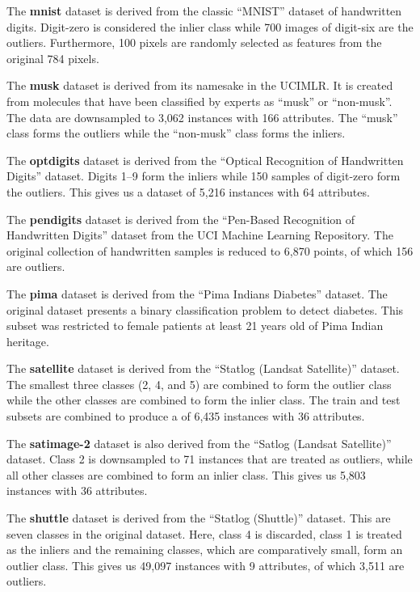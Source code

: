 The \textbf{mnist} dataset is derived from the classic ``MNIST'' dataset of handwritten digits.
Digit-zero is considered the inlier class while 700 images of digit-six are the outliers.
Furthermore, 100 pixels are randomly selected as features from the original 784 pixels.

The \textbf{musk} dataset is derived from its namesake in the UCIMLR\@.
It is created from molecules that have been classified by experts as ``musk'' or ``non-musk''.
The data are downsampled to 3,062 instances with 166 attributes.
The ``musk'' class forms the outliers while the ``non-musk'' class forms the inliers.

The \textbf{optdigits} dataset is derived from the ``Optical Recognition of Handwritten Digits'' dataset.
Digits 1--9 form the inliers while 150 samples of digit-zero form the outliers.
This gives us a dataset of 5,216 instances with 64 attributes.

The \textbf{pendigits} dataset is derived from the ``Pen-Based Recognition of Handwritten Digits'' dataset from the UCI Machine Learning Repository.
The original collection of handwritten samples is reduced to 6,870 points, of which 156 are outliers.

The \textbf{pima} dataset is derived from the ``Pima Indians Diabetes'' dataset.
The original dataset presents a binary classification problem to detect diabetes.
This subset was restricted to female patients at least 21 years old of Pima Indian heritage.

The \textbf{satellite} dataset is derived from the ``Statlog (Landsat Satellite)'' dataset.
The smallest three classes (2, 4, and 5) are combined to form the outlier class while the other classes are combined to form the inlier class.
The train and test subsets are combined to produce a of 6,435 instances with 36 attributes.

The \textbf{satimage-2} dataset is also derived from the ``Satlog (Landsat Satellite)'' dataset.
Class 2 is downsampled to 71 instances that are treated as outliers, while all other classes are combined to form an inlier class.
This gives us 5,803 instances with 36 attributes.

The \textbf{shuttle} dataset is derived from the ``Statlog (Shuttle)'' dataset.
This are seven classes in the original dataset.
Here, class 4 is discarded, class 1 is treated as the inliers and the remaining classes, which are comparatively small, form an outlier class.
This gives us 49,097 instances with 9 attributes, of which 3,511 are outliers.

